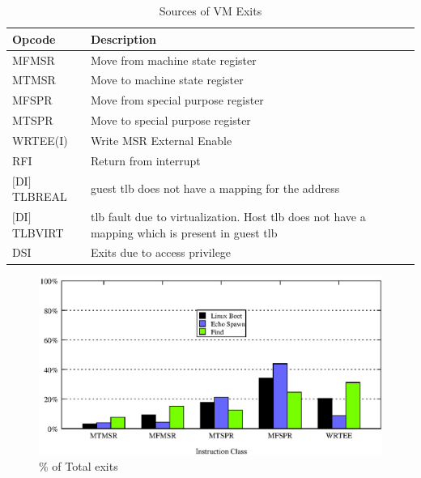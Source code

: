 \documentclass[10pt,twocolumn]{article}
\begin{document}
\begin{table}[!b]
\centering
\caption{Sources of VM Exits}
     \begin{tabular}{|l | p{5cm} |} \hline
       Opcode \verb, , & Description \\ \hline
       MFMSR & Move from machine state register \\ \hline
       MTMSR & Move to machine state register \\\hline
	   MFSPR & Move from special purpose register \\\hline
	   MTSPR & Move to special purpose register \\\hline
	   WRTEE(I) & Write MSR External Enable  \\\hline
	   RFI & Return from interrupt \\\hline
	   $[$DI$]$TLBREAL & guest tlb does not have a mapping for the address\\\hline
	   $[$DI$]$TLBVIRT & tlb fault due to virtualization. Host tlb does not have a mapping which is present in guest tlb \\    \hline
   	   DSI & Exits due to access privilege \\\hline

     \end{tabular}
\label{tab:priv_opcodes}
\end{table}

\begin{figure}[!htb]
\centering

\includegraphics[scale=0.5]{exit_count.eps}
\caption{\% of Total exits}
\label{fig:opcode_ti_fraction}
\end{figure}
\end{document}
